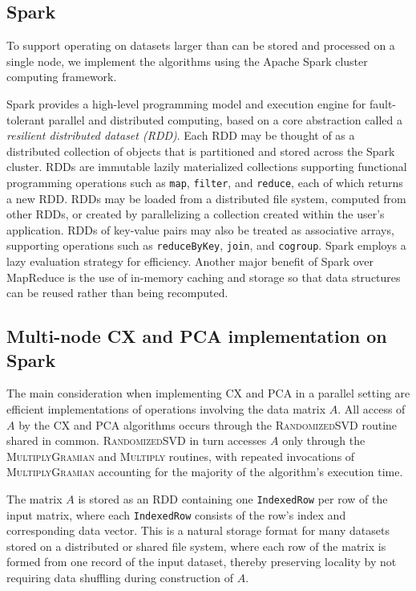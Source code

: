 \subsection{Spark}

To support operating on datasets larger than can be stored and processed on a single node,
we implement the algorithms using the Apache Spark cluster computing framework.

Spark provides a high-level programming model and execution engine for
fault-tolerant parallel and distributed computing, based on a core 
abstraction called a \textit{resilient distributed dataset (RDD)}.
Each RDD may be thought of as a distributed collection of objects that is
partitioned and stored across the Spark cluster.
RDDs are immutable lazily materialized collections supporting functional
programming operations such as \texttt{map}, \texttt{filter}, and \texttt{reduce},
each of which returns a new RDD.
RDDs may be loaded from a distributed file system, computed from other RDDs,
or created by parallelizing a collection created within the user's application.
RDDs of key-value pairs may also be treated as associative arrays, supporting
operations such as \texttt{reduceByKey}, \texttt{join}, and \texttt{cogroup}.
Spark employs a lazy evaluation strategy for efficiency.
Another major benefit of Spark over MapReduce is the use of in-memory caching and storage so that data structures
can be reused rather than being recomputed.

\subsection{Multi-node CX and PCA implementation on Spark}
\label{sec:cx_spark}
The main consideration when implementing CX and PCA in a parallel setting are
efficient implementations of operations involving the data matrix $A$.
All access of $A$ by the CX and PCA algorithms occurs through the
\textsc{RandomizedSVD} routine shared in common.
\textsc{RandomizedSVD} in turn accesses $A$ only through the \textsc{MultiplyGramian} and
\textsc{Multiply} routines, with repeated invocations of \textsc{MultiplyGramian}
accounting for the majority of the algorithm's execution time.

The matrix $A$ is stored as an RDD containing one \texttt{IndexedRow} per row of the input matrix,
where each \texttt{IndexedRow} consists of the row's index and corresponding data vector.
This is a natural storage format for many datasets stored on a distributed or shared file
system, where each row of the matrix is formed from one record of the
input dataset, thereby preserving locality by not requiring data shuffling
during construction of $A$.


